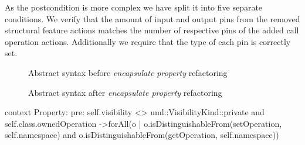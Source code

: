 \documentclass{llncs}
\begin{document}
As the postcondition is more complex we have split it into five separate conditions. We verify that the amount of input and output 
pins from the removed structural feature actions matches the number of respective pins of the added call operation actions. Additionally
we require that the type of each pin is correctly set.

\begin{figure}
 \caption{Abstract syntax before \textit{encapsulate property} refactoring}
 \label{fig:encapsulatebefore}
\end{figure}

\begin{figure}
 \caption{Abstract syntax after \textit{encapsulate property} refactoring}
 \label{fig:encapsulateafter}
\end{figure}

\begin{lstsingle}[language=OCL,caption=OCL for encapsulate property,label=lst:encapsulateproperty]
context Property:
pre:  self.visibility <> uml::VisibilityKind::private and
      self.class.ownedOperation
      ->forAll(o | o.isDistinguishableFrom(setOperation,
              self.namespace) and
      o.isDistinguishableFrom(getOperation, self.namespace))
\end{lstsingle}
\end{document}
